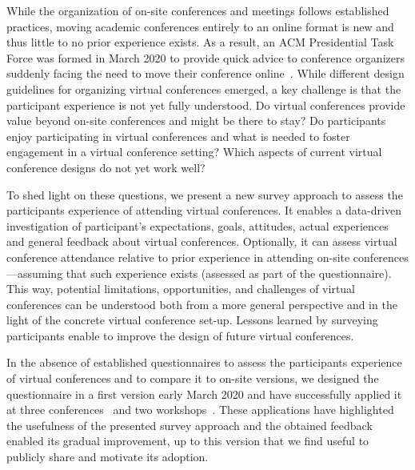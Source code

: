 \documentclass[sigconf]{acmart}
\newcommand{\afblock}[1]{\noindent{\textbf{#1 }}}
\begin{document}
While the organization of on-site conferences and meetings follows established practices, moving academic conferences entirely to an online format is new and thus little to no prior experience exists.
As a result, an ACM Presidential Task Force was formed in March 2020 to provide quick advice to conference organizers suddenly facing the need to move their conference online~\cite{virtConfTaskforce}.
While different design guidelines for organizing virtual conferences emerged, a key challenge is that the participant experience is not yet fully understood. 
Do virtual conferences provide value beyond on-site conferences and might be there to stay?
Do participants enjoy participating in virtual conferences and what is needed to foster engagement in a virtual conference setting?
Which aspects of current virtual conference designs do not yet work well?

\afblock{Contribution.}
To shed light on these questions, we present a new survey approach to assess the participants experience of attending virtual conferences.
It enables a data-driven investigation of participant's expectations, goals, attitudes, actual experiences and general feedback about virtual conferences.
Optionally, it can assess virtual conference attendance relative to prior experience in attending on-site conferences---assuming that such experience exists (assessed as part of the questionnaire).
This way, potential limitations, opportunities, and challenges of virtual conferences can be understood both from a more general perspective and in the light of the concrete virtual conference set-up.
Lessons learned by surveying participants enable to improve the design of future virtual conferences.

In the absence of established questionnaires to assess the participants experience of virtual conferences and to compare it to on-site versions, we designed the questionnaire in a first version early March 2020 and have successfully applied it at three conferences~\cite{PAM2020,pamexperience,QoMEX2020,PAM2021} and two workshops~\cite{ItSecWorkshop, KuvsNetsoft}.
These applications have highlighted the usefulness of the presented survey approach and the obtained feedback enabled its gradual improvement, up to this version that we find useful to publicly share and motivate its adoption. 
\end{document}
